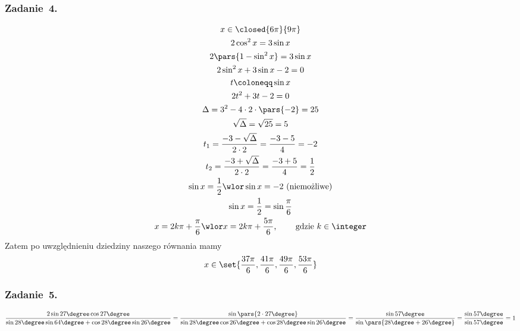 \subsubsection*{Zadanie~4.}
\begin{gather*}
    x \in \closed{6\pi}{9\pi}\\
    2\cos^2x = 3\sin x\\
    2\pars{1 - \sin^2x} = 3\sin x\\
    2\sin^2x + 3\sin x - 2 = 0\\
    t \coloneqq \sin x\\
    2t^2 + 3t - 2 = 0\\
    \Delta = 3^2 - 4 \cdot 2 \cdot \pars{-2} = 25\\
    \sqrt{\Delta} = \sqrt{25} = 5\\
    t_1 = \frac{-3 - \sqrt{\Delta}}{2 \cdot 2} = \frac{-3 - 5}{4} = -2\\
    t_2 = \frac{-3 + \sqrt{\Delta}}{2 \cdot 2} = \frac{-3 + 5}{4} = \frac{1}{2}\\
    \sin x = \frac{1}{2} \wlor \sin x = -2 \text{ (niemożliwe)}\\
    \sin x = \frac{1}{2} = \sin\frac{\pi}{6}\\
    x = 2k\pi + \frac{\pi}{6} \wlor x = 2k\pi + \frac{5\pi}{6} \text{,\qquad{} gdzie \(k \in \integer\)}
\end{gather*}
Zatem po uwzględnieniu dziedziny naszego równania mamy
\begin{equation*}
    x \in \set{\frac{37\pi}{6}, \frac{41\pi}{6}, \frac{49\pi}{6}, \frac{53\pi}{6}}
\end{equation*}
\subsubsection*{Zadanie~5.}
\begin{equation*}
    \frac{2\sin27\degree\cos27\degree}{\sin28\degree\sin64\degree + \cos28\degree\sin26\degree}
        = \frac{\sin\pars{2 \cdot 27\degree}}{\sin28\degree\cos26\degree + \cos28\degree\sin26\degree}
        = \frac{\sin57\degree}{\sin\pars{28\degree + 26\degree}}
        = \frac{\sin57\degree}{\sin57\degree}
        = 1
\end{equation*}
